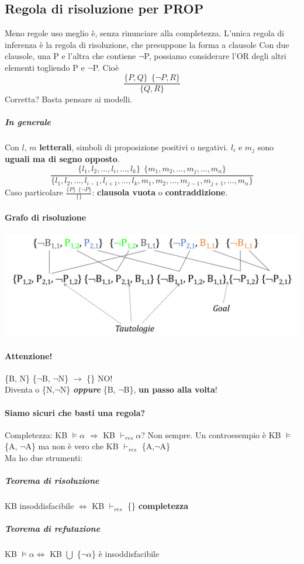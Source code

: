\documentclass[10pt]{book}
\begin{document}
\subsection{Regola di risoluzione per PROP} Meno regole uso meglio è, senza rinunciare alla completezza. L'unica regola di inferenza è la regola di risoluzione, che presuppone la forma a clausole
Con due clausole, una P e l'altra che contiene $\neg$P, possiamo considerare l'OR degli altri elementi togliendo P e $\neg$P. Cioè $$\frac{\{P, Q\}\:\:\{\neg P, R\}}{\{Q, R\}}$$ Corretta? Basta pensare ai modelli.
\subparagraph{In generale} Con $l$, $m$ \textbf{letterali}, simboli di proposizione positivi o negativi. $l_i$ e $m_j$ sono \textbf{uguali ma di segno opposto}.
$$\frac{\{l_1, l_2,\ldots, l_i, \ldots, l_k\}\:\:\{m_1, m_2, \ldots, m_j, \ldots, m_n\}}{\{l_1, l_2,\ldots, l_{i-1}, l_{i+1}, \ldots, l_k, m_1, m_2, \ldots, m_{j-1}, m_{j+1}, \ldots, m_n\}}$$
Caso particolare $\frac{\{P\}\:\:\{\neg P\}}{\{\}}$: \textbf{clausola vuota} o \textbf{contraddizione}.
\paragraph{Grafo di risoluzione}
\begin{center}
	\includegraphics[scale=0.6]{grafosoluz.png}
\end{center}
\paragraph{Attenzione!} \{B, N\} \{$\neg$B, $\neg$N\} $\rightarrow$ \{\} NO!\\
Diventa o \{N,$\neg$N\} \textbf{\textit{oppure}} \{B, $\neg$B\}, \textbf{un passo alla volta}!
\paragraph{Siamo sicuri che basti una regola?} Completezza: KB $\vDash \alpha$ $\Rightarrow$ KB $\vdash_{res} \alpha$? Non sempre. Un controesempio è KB $\vDash$ \{A, $\neg$A\} ma non è vero che KB $\vdash_{res}$ \{A,$\neg$A\}\\
Ma ho due strumenti:
\subparagraph{Teorema di risoluzione} KB insoddisfacibile $\Leftrightarrow$ KB $\vdash_{res}$ \{\} \textbf{completezza}
\subparagraph{Teorema di refutazione} KB $\vDash \alpha \Leftrightarrow$ KB $\bigcup$ \{$\neg\alpha$\} è insoddisfacibile
\end{document}
